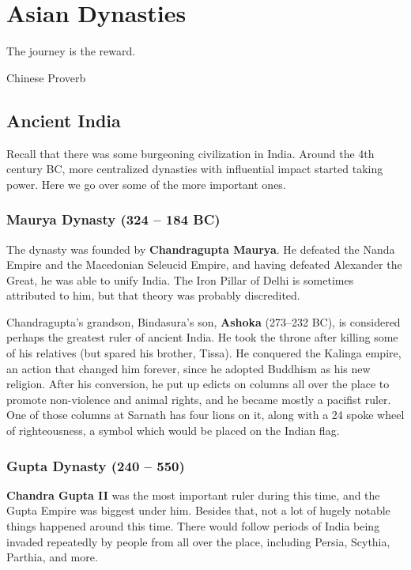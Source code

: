 \chapter{Asian Dynasties}

\epigraph{%
  The journey is the reward.
}{Chinese Proverb}

\section{Ancient India}

Recall that there was some burgeoning civilization in India.
Around the 4th century BC, more centralized dynasties with influential impact started taking power.
Here we go over some of the more important ones.

\subsection*{Maurya Dynasty (324 -- 184 BC)}

The dynasty was founded by \textbf{Chandragupta Maurya}.
He defeated the Nanda Empire and the Macedonian Seleucid Empire,
and having defeated Alexander the Great, he was able to unify India.
The Iron Pillar of Delhi is sometimes attributed to him, but that theory was probably discredited.

Chandragupta's grandson, Bindasura's son,
\textbf{Ashoka} (273--232 BC), is considered perhaps the greatest ruler of ancient India.
He took the throne after killing some of his relatives (but spared his brother, Tissa).
He conquered the Kalinga empire, an action that changed him forever,
since he adopted Buddhism as his new religion.
After his conversion, he put up edicts on columns all over the place to promote non-violence and animal rights,
and he became mostly a pacifist ruler.
One of those columns at Sarnath has four lions on it,
along with a 24 spoke wheel of righteousness, a symbol which would be placed on the Indian flag.

\subsection*{Gupta Dynasty (240 -- 550)}

\textbf{Chandra Gupta II} was the most important ruler during this time,
and the Gupta Empire was biggest under him.
Besides that, not a lot of hugely notable things happened around this time.
There would follow periods of India being invaded repeatedly by people from
all over the place, including Persia, Scythia, Parthia, and more.

